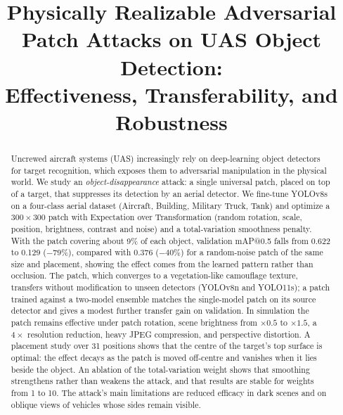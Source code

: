 \documentclass[conference]{IEEEtran}
\begin{document}
\title{Physically Realizable Adversarial Patch Attacks on UAS Object Detection:\\
Effectiveness, Transferability, and Robustness}

\author{
}

\maketitle

\begin{abstract}
Uncrewed aircraft systems (UAS) increasingly rely on deep-learning object detectors for
target recognition, which exposes them to adversarial manipulation in the physical world.
We study an \emph{object-disappearance} attack: a single universal patch, placed on top of
a target, that suppresses its detection by an aerial detector. We fine-tune YOLOv8s on a
four-class aerial dataset (Aircraft, Building, Military Truck, Tank) and optimize a
$300\times300$ patch with Expectation over Transformation (random rotation, scale,
position, brightness, contrast and noise) and a total-variation smoothness penalty. With the
patch covering about 9\% of each object, validation mAP@0.5 falls from 0.622 to 0.129
($-79\%$), compared with 0.376 ($-40\%$) for a random-noise patch of the same size and
placement, showing the effect comes from the learned pattern rather than occlusion. The
patch, which converges to a vegetation-like camouflage texture, transfers without
modification to unseen detectors (YOLOv8n and YOLO11s); a patch trained against a two-model
ensemble matches the single-model patch on its source detector and gives a modest further
transfer gain on validation. In simulation the patch remains effective
under patch rotation, scene brightness from $\times0.5$ to $\times1.5$, a $4\times$
resolution reduction, heavy JPEG compression, and perspective distortion. A placement study
over 31 positions shows that the centre of the target's top surface is optimal: the effect
decays as the patch is moved off-centre and vanishes when it lies beside the object. An
ablation of the total-variation weight shows that smoothing strengthens rather than weakens
the attack, and that results are stable for weights from 1 to 10. The attack's main
limitations are reduced efficacy in dark scenes and on oblique views of vehicles whose
sides remain visible.
\end{abstract}
\end{document}
